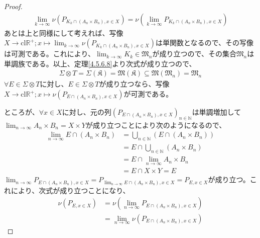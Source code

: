 \documentclass[dvipdfmx]{jsarticle}
\begin{document}
\begin{proof}
\begin{align*}
\lim_{k \rightarrow \infty}{\nu\left( P_{K_{k} \cap \left( A_{n} \times B_{n} \right),x \in X} \right)} = \nu\left( \lim_{k \rightarrow \infty}P_{K_{k} \cap \left( A_{n} \times B_{n} \right),x \in X} \right)
\end{align*}
あとは上と同様にして考えれば、写像$X \rightarrow \mathrm{cl}\mathbb{R}^{+};x \mapsto \lim_{k \rightarrow \infty}{\nu\left( P_{K_{k} \cap \left( A_{n} \times B_{n} \right),x \in X} \right)}$は単関数となるので、その写像は可測である。これにより、$\lim_{k \rightarrow \infty}K_{k} \in \mathfrak{M}_{n}$が成り立つので、その集合$\mathfrak{M}_{n}$は単調族である。以上、定理\ref{4.5.6.8}より次式が成り立つので、
\begin{align*}
\varSigma \otimes T = \varSigma\left( \mathfrak{K} \right) = \mathfrak{M}\left( \mathfrak{K} \right)\subseteq \mathfrak{M}\left( \mathfrak{M}_{n} \right) = \mathfrak{M}_{n}
\end{align*}
$\forall E \in \varSigma \otimes T$に対し、$E \in \varSigma \otimes T$が成り立つなら、写像$X \rightarrow \mathrm{cl}\mathbb{R}^{+};x \mapsto \nu\left( P_{E \cap \left( A_{n} \times B_{n} \right),x \in X} \right)$が可測である。\par
ところが、$\forall x \in X$に対し、元の列$\left( P_{E \cap \left( A_{n} \times B_{n} \right),x \in X} \right)_{n \in \mathbb{N}}$は単調増加して$\lim_{n \rightarrow \infty}{A_{n} \times B_{n}} = X \times Y$が成り立つことにより次のようになるので、
\begin{align*}
\lim_{n \rightarrow \infty}{E \cap \left( A_{n} \times B_{n} \right)} &= \bigcup_{n \in \mathbb{N}} \left( E \cap \left( A_{n} \times B_{n} \right) \right)\\
&= E \cap \bigcup_{n \in \mathbb{N}} \left( A_{n} \times B_{n} \right)\\
&= E \cap \lim_{n \rightarrow \infty}{A_{n} \times B_{n}}\\
&= E \cap X \times Y = E
\end{align*}
$\lim_{n \rightarrow \infty}P_{E \cap \left( A_{n} \times B_{n} \right),x \in X} = P_{\lim_{n \rightarrow \infty}{E \cap \left( A_{n} \times B_{n} \right)},x \in X} = P_{E,x \in X}$が成り立つ。これにより、次式が成り立つことになり、
\begin{align*}
\nu\left( P_{E,x \in X} \right) &= \nu\left( \lim_{n \rightarrow \infty}P_{E \cap \left( A_{n} \times B_{n} \right),x \in X} \right)\\
&= \lim_{n \rightarrow \infty}{\nu\left( P_{E \cap \left( A_{n} \times B_{n} \right),x \in X} \right)}

\end{align*}
\end{proof}
\end{document}
